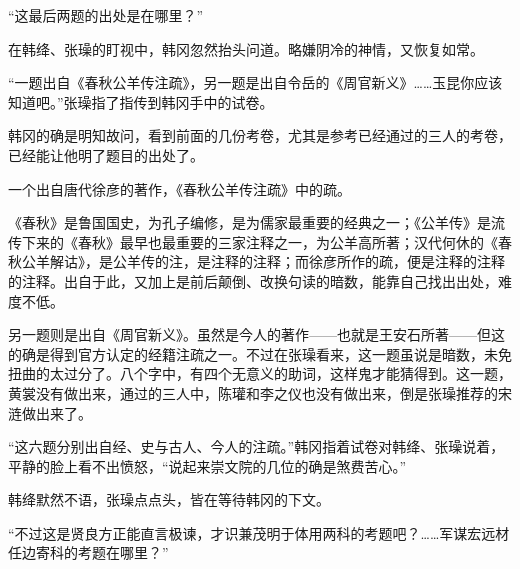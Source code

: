 “这最后两题的出处是在哪里？”

在韩绛、张璪的盯视中，韩冈忽然抬头问道。略嫌阴冷的神情，又恢复如常。

“一题出自《春秋公羊传注疏》，另一题是出自令岳的《周官新义》……玉昆你应该知道吧。”张璪指了指传到韩冈手中的试卷。

韩冈的确是明知故问，看到前面的几份考卷，尤其是参考已经通过的三人的考卷，已经能让他明了题目的出处了。

一个出自唐代徐彦的著作，《春秋公羊传注疏》中的疏。

《春秋》是鲁国国史，为孔子编修，是为儒家最重要的经典之一；《公羊传》是流传下来的《春秋》最早也最重要的三家注释之一，为公羊高所著；汉代何休的《春秋公羊解诂》，是公羊传的注，是注释的注释；而徐彦所作的疏，便是注释的注释的注释。出自于此，又加上是前后颠倒、改换句读的暗数，能靠自己找出出处，难度不低。

另一题则是出自《周官新义》。虽然是今人的著作——也就是王安石所著——但这的确是得到官方认定的经籍注疏之一。不过在张璪看来，这一题虽说是暗数，未免扭曲的太过分了。八个字中，有四个无意义的助词，这样鬼才能猜得到。这一题，黄裳没有做出来，通过的三人中，陈瓘和李之仪也没有做出来，倒是张璪推荐的宋涟做出来了。

“这六题分别出自经、史与古人、今人的注疏。”韩冈指着试卷对韩绛、张璪说着，平静的脸上看不出愤怒，“说起来崇文院的几位的确是煞费苦心。”

韩绛默然不语，张璪点点头，皆在等待韩冈的下文。

“不过这是贤良方正能直言极谏，才识兼茂明于体用两科的考题吧？……军谋宏远材任边寄科的考题在哪里？”
